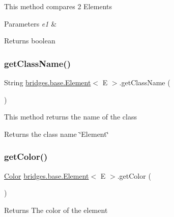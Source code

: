 This method compares 2 Elements 
\begin{DoxyParams}{Parameters}
{\em e1} & \\
\hline
\end{DoxyParams}
\begin{DoxyReturn}{Returns}
boolean 
\end{DoxyReturn}
\mbox{\label{classbridges_1_1base_1_1_element_aa235244426486921bef319a28616bf8b}} 
\subsubsection{\texorpdfstring{getClassName()}{getClassName()}}
{\footnotesize\ttfamily String \mbox{\hyperlink{classbridges_1_1base_1_1_element}{bridges.\+base.\+Element}}$<$ E $>$.get\+Class\+Name (\begin{DoxyParamCaption}{ }\end{DoxyParamCaption})}

This method returns the name of the class \begin{DoxyReturn}{Returns}
the class name \char`\"{}\+Element\char`\"{} 
\end{DoxyReturn}
\mbox{\label{classbridges_1_1base_1_1_element_a6b80259f4f23b30df5486bf70f17c3b8}} 
\subsubsection{\texorpdfstring{getColor()}{getColor()}}
{\footnotesize\ttfamily \mbox{\hyperlink{classbridges_1_1base_1_1_color}{Color}} \mbox{\hyperlink{classbridges_1_1base_1_1_element}{bridges.\+base.\+Element}}$<$ E $>$.get\+Color (\begin{DoxyParamCaption}{ }\end{DoxyParamCaption})}

\begin{DoxyReturn}{Returns}
The color of the element 
\end{DoxyReturn}
\mbox{\label{classbridges_1_1base_1_1_element_a6a1b70fa4b1936d10c6deb433acf8cd9}} 
